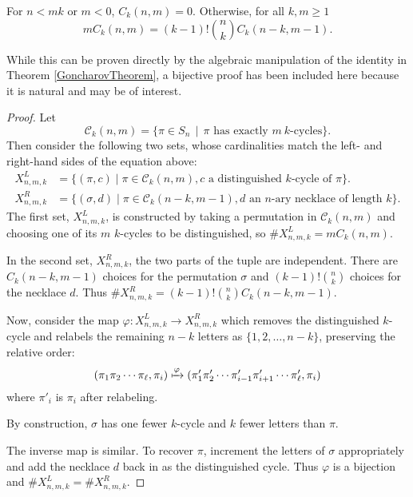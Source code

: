 \begin{lemma}
  \label{cycleRecursion}
  For $n < mk$ or $m < 0$, $C_k(n, m) = 0$. Otherwise,
  for all $k, m \geq 1$ \begin{equation}
    mC_k(n, m) = (k-1)!\binom{n}{k}C_k(n-k, m-1).
  \end{equation}
\end{lemma}
While this can be proven directly by the algebraic manipulation of the
identity in Theorem \ref{GoncharovTheorem}, a bijective proof has been
included here because it is natural and may be of interest.
\begin{proof}
  Let \begin{equation}
  \mathcal C_k(n, m) = \{ \pi \in S_n\,\mid\,\pi \text{ has exactly } m\ k \text{-cycles}\}.
  \end{equation}
  Then consider the following two sets, whose cardinalities match the left- and
  right-hand sides of the equation above:
  \begin{align}
    X^{L}_{n,m,k} &= \{ (\pi, c) \mid \pi \in \mathcal C_k(n, m), c \text{ a distinguished } k\text{-cycle of } \pi \}. \\
    X^{R}_{n,m,k} &= \{ (\sigma, d) \mid \pi \in \mathcal C_k(n-k, m-1), d \text{ an } n\text{-ary necklace of length } k\}.
  \end{align}
  The first set, $X^{L}_{n,m,k}$, is constructed by taking a permutation in
  $\mathcal C_k(n,m)$ and choosing one of its $m$ $k$-cycles to be distinguished, so
  $\#X^{L}_{n,m,k} = mC_k(n,m)$.

  In the second set, $X^{R}_{n,m,k}$, the two parts of the tuple are independent.
  There are $C_k(n-k, m-1)$ choices for the permutation $\sigma$ and $(k-1)!\binom{n}{k}$
  choices for the necklace $d$.
  Thus $\#X^{R}_{n,m,k} = (k-1)!\binom{n}{k}C_k(n-k, m-1)$.

  Now, consider the map $\varphi \colon X^{L}_{n,m,k} \rightarrow X^{R}_{n,m,k}$
  which removes the distinguished $k$-cycle and relabels the remaining $n - k$
  letters as $\{1, 2, \dots, n - k\}$, preserving the relative order:
  \begin{equation}
    (\pi_1\pi_2 \cdots \pi_\ell, \pi_i) \xmapsto{\varphi} (\pi'_1\pi'_2 \cdots \pi'_{i-1}\pi'_{i+1} \cdots \pi'_\ell, \pi_i)
  \end{equation} where $\pi'_i$ is $\pi_i$ after relabeling.

  By construction, $\sigma$ has one fewer $k$-cycle and $k$ fewer letters
  than $\pi$.

  The inverse map is similar. To recover $\pi$, increment the letters of $\sigma$ appropriately
  and add the necklace $d$ back in as the distinguished cycle.
  Thus $\varphi$ is a bijection and $\#X^{L}_{n,m,k} = \#X^{R}_{n,m,k}$.
\end{proof}

